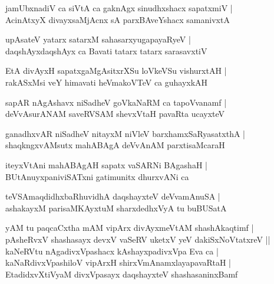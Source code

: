 \documentclass[twoside,12pt,openright]{book}
\newcounter{shloka}[chapter]
\begin{document}
\begin{shloka}
jamUbxnadiV ca siVtA ca gaknAgx sinudhxshacx sapatxmiV |\\
AcinAtxyX divayxsaMjAcnx sA parxBAveYshacx samanivxtA
\end{shloka}

\begin{shloka}
upAsateV yatarx satarxM sahasarxyugapayaRyeV |\\
daqshAyxdaqshAyx ca Bavati tatarx tatarx sarasavxtiV 
\end{shloka}

\begin{shloka}
EtA divAyxH sapatxgaMgAsitxrXSu loVkeVSu vishurxtAH |\\
rakASxMsi veY himavati heVmakoVTeV ca guhayxkAH 
\end{shloka}

\begin{shloka}
sapAR nAgAshavx niSadheV goVkaNaRM ca tapoVvanamf |\\
deVvAsurANAM saveRVSAM shevxVtaH pavaRta ucayxteV 
\end{shloka}

\begin{shloka}
ganadhxvAR niSadheV nitayxM niVleV barxhamxSaRyasatxthA |\\
shaqkngxvAMsutx mahABAgA deVvAnAM parxtisaMcaraH
\end{shloka}

\begin{shloka}
iteyxVtAni mahABAgAH sapatx vaSARNi BAgashaH |\\
BUtAnuyxpaniviSATxni gatimunitx dhurxvANi ca
\end{shloka}

\begin{shloka}
teVSAmaqdidhxbaRhuvidhA daqshayxteV deVvamAnuSA |\\
ashakayxM parisaMKAyxtuM sharxdedhxVyA tu  buBUSatA
\end{shloka}

\begin{shloka}
yAM tu paqcaCxtha mAM vipArx divAyxmeVtAM shashAkaqtimf |\\
pAsheRvxV shashasayx devxV vaSeRV uketxV yeV dakiSxNoVtatxreV ||\\
kaNeRVtu nAgadivxVpashacx kAshayxpadivxVpa Eva ca |\\
kaNaRdivxVpashiloV vipArxH shirxVmAnamxlayapavaRtaH |\\
EtadidxvXtiVyaM divxVpasayx daqshayxteV shashasaninxBamf
\end{shloka}
\end{document}
